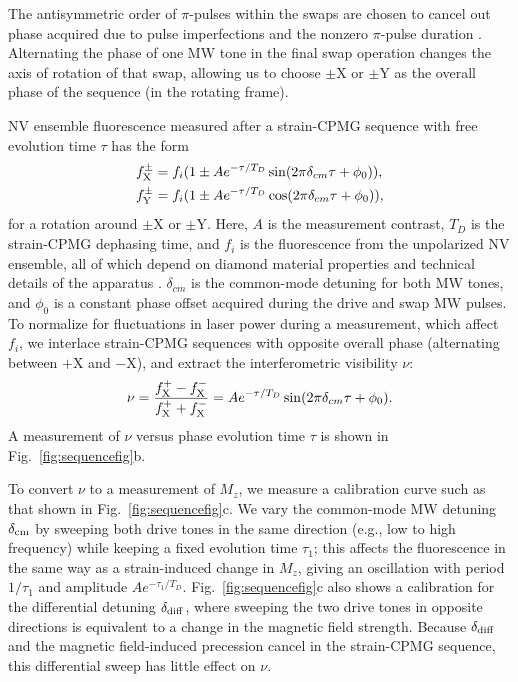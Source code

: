 \documentclass[reprint,superscriptaddress,hyphens,amsmath,amssymb,aps,prx,float]{revtex4-2}
\begin{document}
The antisymmetric order of $\pi$-pulses within the swaps are chosen to cancel out phase acquired due to pulse imperfections and the nonzero $\pi$-pulse duration \cite{AwschalomThermometry2013}.  Alternating the phase of one MW tone in the final swap operation changes the axis of rotation of that swap, allowing us to choose $\pm$X or $\pm$Y as the overall phase of the sequence (in the rotating frame). 

NV ensemble fluorescence measured after a strain-CPMG sequence with free evolution time $\tau$ has the form
\begin{equation}
\label{eqn:fluor}
\begin{split}
    f_{\rm X}^\pm &= f_i(1\pm A e^{-\tau/T_D} \sin(2\pi \delta_{cm} \tau+\phi_0)),\\
    f_{\rm Y}^\pm &= f_i(1\pm A e^{-\tau/T_D} \cos(2\pi \delta_{cm} \tau+\phi_0)),
    \end{split}
\end{equation}
for a rotation around $\pm$X or $\pm$Y.  Here, $A$ is the measurement contrast, $T_D$ is the strain-CPMG dephasing time, and $f_i$ is the fluorescence from the unpolarized NV ensemble, all of which depend on diamond material properties and technical details of the apparatus \cite{SensitivityReport}.  $\delta_{cm}$ is the common-mode detuning for both MW tones, and $\phi_0$ is a constant phase offset acquired during the drive and swap MW pulses.  To normalize for fluctuations in laser power during a measurement, which affect $f_i$, we interlace strain-CPMG sequences with opposite overall phase (alternating between $+$X and $-$X), and extract the interferometric visibility $\nu$:
\begin{equation}
\label{eqn:suppvis}
    \nu=\frac{f_{\rm X}^+-f_{\rm X}^-}{f_{\rm X}^++f_{\rm X}^-}=A e^{-\tau/T_D} \sin(2\pi \delta_{cm} \tau+\phi_0).
\end{equation}
A measurement of $\nu$ versus phase evolution time $\tau$ is shown in Fig.~\ref{fig:sequencefig}b.  

To convert $\nu$ to a measurement of $M_z$, we measure a calibration curve such as that shown in Fig.~\ref{fig:sequencefig}c. We vary the common-mode MW detuning $\delta_{\rm cm}$ by sweeping both drive tones in the same direction (e.g., low to high frequency) while keeping a fixed evolution time $\tau_1$; this affects the fluorescence in the same way as a strain-induced change in $M_z$, giving an oscillation with period $1/\tau_1$ and amplitude $A e^{-\tau_1/T_D}$.  Fig.~\ref{fig:sequencefig}c also shows a calibration for the differential detuning $\delta_{\rm diff}$, where sweeping the two drive tones in opposite directions is equivalent to a change in the magnetic field strength.  Because $\delta_{\rm diff}$ and the magnetic field-induced precession cancel in the strain-CPMG sequence, this differential sweep has little effect on $\nu$.  
\end{document}
